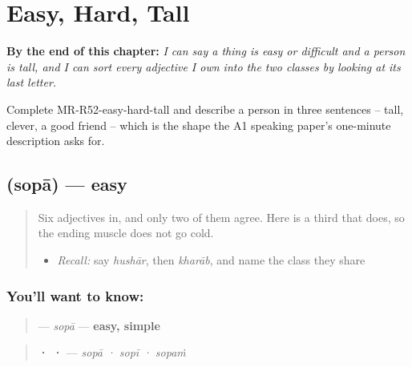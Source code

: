 
\chapter{Easy, Hard, Tall}
\label{ch:mr-easy-hard-tall}

\begin{chapteropening}
\textbf{By the end of this chapter:} \emph{I can say a thing is easy or difficult and a person is tall, and I can sort every adjective I own into the two classes by looking at its last letter.}

Complete MR-R52-easy-hard-tall and describe a person in three sentences -- tall, clever, a good friend -- which is the shape the A1 speaking paper's one-minute description asks for.
\end{chapteropening}

\section[\texorpdfstring{\mr{सोपा} (sopā)}{सोपा (sopā)}]{ (sopā) — easy}

\label{lesson:MR-C52-sopa}



\begin{quote}
Six adjectives in, and only two of them agree. Here is a third that does, so the ending muscle does not go cold.

\begin{itemize}
\raggedright
  \item \emph{Recall:} say \emph{hushār}, then \emph{kharāb}, and name the class they share
\end{itemize}
\end{quote}

\subsection*{You'll want to know: }
\begin{quote}
\textbf{} — \emph{sopā} — \textbf{easy, simple}
\end{quote}

\begin{quote}
\textbf{ ·  · } — \emph{sopā · sopī · sopaṁ}
\end{quote}

